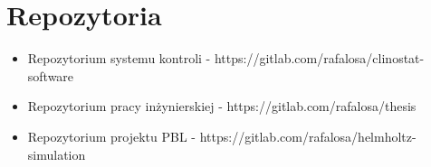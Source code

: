 \chapter*{Repozytoria}

\begin{itemize}
	\item Repozytorium systemu kontroli - https://gitlab.com/rafalosa/clinostat-software
	\item Repozytorium pracy inżynierskiej - https://gitlab.com/rafalosa/thesis
	\item Repozytorium projektu PBL - https://gitlab.com/rafalosa/helmholtz-simulation
\end{itemize}\textbf{}